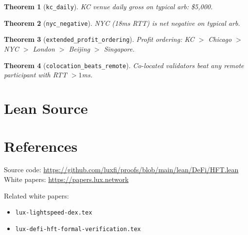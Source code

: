 \documentclass[11pt]{article}
\newtheorem{theorem}{Theorem}
\begin{document}
\begin{theorem}[\texttt{kc\_daily}]
KC venue daily gross on typical arb: \$5,000.
\end{theorem}

\begin{theorem}[\texttt{nyc\_negative}]
NYC (18ms RTT) is net negative on typical arb.
\end{theorem}

\begin{theorem}[\texttt{extended\_profit\_ordering}]
Profit ordering: KC $>$ Chicago $>$ NYC $>$ London $>$ Beijing $>$ Singapore.
\end{theorem}

\begin{theorem}[\texttt{colocation\_beats\_remote}]
Co-located validators beat any remote participant with RTT $> 1$ms.
\end{theorem}


\section{Lean Source}


\section{References}
\noindent Source code: \url{https://github.com/luxfi/proofs/blob/main/lean/DeFi/HFT.lean}\\
\noindent White papers: \url{https://papers.lux.network}

\noindent Related white papers:
\begin{itemize}
  \item \texttt{lux-lightspeed-dex.tex}
  \item \texttt{lux-defi-hft-formal-verification.tex}
\end{itemize}
\end{document}

